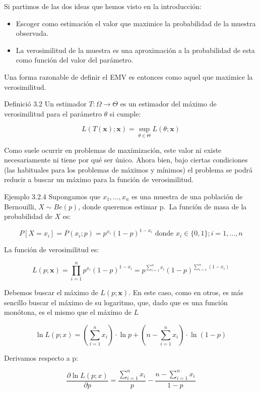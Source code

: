 \documentclass[
]{article}
\providecommand{\tightlist}{%
  \setlength{\itemsep}{0pt}\setlength{\parskip}{0pt}}
\begin{document}
Si partimos de las dos ideas que hemos visto en la introducción:

\begin{itemize}
\tightlist
\item
  Escoger como estimación el valor que maximice la probabilidad de la muestra observada.
\item
  La verosimilitud de la muestra es una aproximación a la probabilidad de esta como función del valor del parámetro.
\end{itemize}

Una forma razonable de definir el EMV es entonces como aquel que maximice la verosimilitud.

Definició 3.2 Un estimador \(T: \Omega \longrightarrow \Theta\) es un estimador del máximo de verosimilitud para el parámetro \(\theta\) si cumple:

\[
L(T(\mathbf{x}) ; \mathbf{x})=\sup _{\theta \in \Theta} L(\theta ; \mathbf{x})
\]

Como suele ocurrir en problemas de maximización, este valor ni existe necesariamente ni tiene por qué ser único. Ahora bien, bajo ciertas condiciones (las habituales para los problemas de máximos y mínimos) el problema se podrá reducir a buscar un máximo para la función de verosimilitud.

Ejemplo 3.2.4 Supongamos que \(x_{1}, \ldots, x_{n}\) es una muestra de una población de Bernouilli, \(X \sim B e(p)\), donde queremos estimar p.~La función de masa de la probabilidad de \(X\) es:

\[
P\left[X=x_{i}\right]=P\left(x_{i} ; p\right)=p^{x_{i}}(1-p)^{1-x_{i}} \text { donde } x_{i} \in\{0,1\} ; i=1, \ldots, n
\]

La función de verosimilitud es:

\[
L(p ; \mathbf{x})=\prod_{i=1}^{n} p^{x_{i}}(1-p)^{1-x_{i}}=p^{\sum_{i=1}^{n} x_{i}}(1-p)^{\sum_{i=1}^{n}\left(1-x_{i}\right)}
\]

Debemos buscar el máximo de \(L(p ; \mathbf{x})\). En este caso, como en otros, es más sencillo buscar el máximo de su logaritmo, que, dado que es una función monótona, es el mismo que el máximo de \(L\)

\[
\ln L(p ; x)=\left(\sum_{i=1}^{n} x_{i}\right) \cdot \ln p+\left(n-\sum_{i=1}^{n} x_{i}\right) \cdot \ln (1-p)
\]

Derivamos respecto a p:

\[
\frac{\partial \ln L(p ; x)}{\partial p}=\frac{\sum_{i=1}^{n} x_{i}}{p}-\frac{n-\sum_{i=1}^{n} x_{i}}{1-p}
\]
\end{document}
